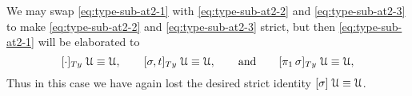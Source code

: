 \documentclass[a4paper,UKenglish,numberwithinsect,cleveref,thm-restate]{lipics-v2021}
\begin{document}
We may swap \eqref{eq:type-sub-at2-1} with \eqref{eq:type-sub-at2-2} and \eqref{eq:type-sub-at2-3} to make \eqref{eq:type-sub-at2-2} and \eqref{eq:type-sub-at2-3} strict, but then \eqref{eq:type-sub-at2-1} will be elaborated to 
\[
[ \emptysub ]_{\Ty}\;\UU         \judgeq \UU, \qquad
[ \sigma, t ]_{\Ty}\;\UU         \judgeq \UU, \qquad\text{and}\qquad 
[ \pi_1\,\sigma ]_{\Ty}\;\UU     \judgeq \UU,
\]
Thus in this case we have again lost the desired strict identity $[\sigma]\;\mathcal{U} \equiv \mathcal{U}$.
%
\end{document}
